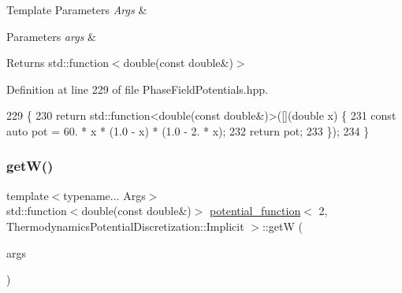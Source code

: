 \begin{DoxyTemplParams}{Template Parameters}
{\em Args} & \\
\hline
\end{DoxyTemplParams}

\begin{DoxyParams}{Parameters}
{\em args} & \\
\hline
\end{DoxyParams}
\begin{DoxyReturn}{Returns}
std\+::function$<$double(const double\&)$>$ 
\end{DoxyReturn}


Definition at line 229 of file Phase\+Field\+Potentials.\+hpp.


\begin{DoxyCode}
229                                                         \{
230     \textcolor{keywordflow}{return} std::function<double(const double&)>([](\textcolor{keywordtype}{double} x) \{
231       \textcolor{keyword}{const} \textcolor{keyword}{auto} pot = 60. * x * (1.0 - x) * (1.0 - 2. * x);
232       \textcolor{keywordflow}{return} pot;
233     \});
234   \}
\end{DoxyCode}
\mbox{\label{structpotential__function_3_012_00_01ThermodynamicsPotentialDiscretization_1_1Implicit_01_4_aa1307003df5d4f4a8bd2fee5966e5a2c}} 
\subsubsection{\texorpdfstring{get\+W()}{getW()}}
{\footnotesize\ttfamily template$<$typename... Args$>$ \\
std\+::function$<$double(const double\&)$>$ \hyperlink{structpotential__function}{potential\+\_\+function}$<$ 2, Thermodynamics\+Potential\+Discretization\+::\+Implicit $>$\+::getW (\begin{DoxyParamCaption}\item[{Args...}]{args }\end{DoxyParamCaption})\hspace{0.3cm}{\ttfamily [inline]}}



